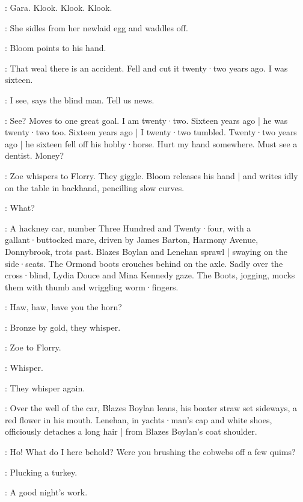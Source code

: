 \BlackLiz:
Gara.
Klook.
Klook.
Klook.

:
She sidles from her newlaid egg and waddles off.

:
Bloom points to his hand.

\Bloom:
That weal there is an accident.
Fell and cut it twenty·two years ago.
I was sixteen.

\Zoe:
I see,
says the blind man.
Tell us news.

\Stephen:
See?
Moves to one great goal.
I am twenty·two.
Sixteen years ago |
he was twenty·two too.
Sixteen years ago |
I twenty·two tumbled.
Twenty·two years ago |
he sixteen fell off his hobby·horse.
Hurt my hand somewhere.
Must see a dentist.
Money?

:
Zoe whispers to Florry.
They giggle.
Bloom releases his hand |
and writes idly on the table in backhand,
pencilling slow curves.

\Florry:
What?


:
A hackney car,
number Three Hundred and Twenty·four,
with a gallant·butt\-ocked mare,
driven by James Barton,
Harmony Avenue,
Donnybrook,
trots past.
Blazes Boylan and Lenehan sprawl |
swaying on the side·seats.
The Ormond boots crouches behind on the axle.
%
Sadly over the cross·blind,
Lydia Douce and Mina Kennedy gaze.
The Boots,
jogging,
mocks them with thumb and wriggling worm·fingers.

\Boots:
Haw,
haw,
have you the horn?

:
Bronze by gold,
they whisper.

:
Zoe to Florry.

\Zoe:
Whisper.

:
They whisper again.

:
Over the well of the car,
Blazes Boylan leans,
his boater straw set sideways,
a red flower in his mouth.
Lenehan,
in yachts·man's cap and white shoes,
%
officiously detaches a long hair |
from Blazes Boylan's coat shoulder.

\Lenehan:
Ho!
What do I here behold?
Were you brushing the cobwebs off a few quims?

\Boylan:
Plucking a turkey.

\Lenehan:
A good night's work.

